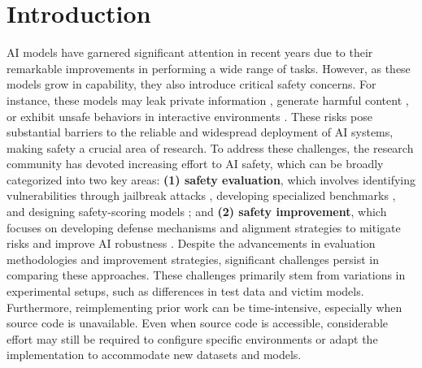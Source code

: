 \section{Introduction}
AI models have garnered significant attention in recent years due to their remarkable improvements in performing a wide range of tasks. However, as these models grow in capability, they also introduce critical safety concerns. For instance, these models may leak private information \cite{DBLP:conf/acl/ZhangWH23}, generate harmful content \cite{DBLP:journals/corr/abs-2307-15043}, or exhibit unsafe behaviors in interactive environments \cite{zhang2024agent}. 
These risks pose substantial barriers to the reliable and widespread deployment of AI systems, making safety a crucial area of research.
To address these challenges, the research community has devoted increasing effort to AI safety, which can be broadly categorized into two key areas: \textbf{(1) safety evaluation}, which involves identifying vulnerabilities through jailbreak attacks \cite{liu2023autodan, yu2023gptfuzzer}, developing specialized benchmarks \cite{DBLP:conf/icml/MazeikaPYZ0MSLB24}, and designing safety-scoring models \cite{inan2023llama, zhang2024shieldlm}; and \textbf{(2) safety improvement}, which focuses on developing defense mechanisms and alignment strategies to mitigate risks and improve AI robustness \cite{selfreminder}. 
Despite the advancements in evaluation methodologies and improvement strategies, significant challenges persist in comparing these approaches. These challenges primarily stem from variations in experimental setups, such as differences in test data and victim models. Furthermore, reimplementing prior work can be time-intensive, especially when source code is unavailable. Even when source code is accessible, considerable effort may still be required to configure specific environments or adapt the implementation to accommodate new datasets and models.

